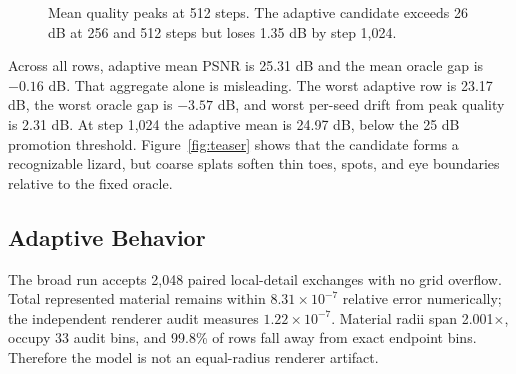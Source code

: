 \documentclass[sigconf,nonacm]{acmart}
\begin{document}
\begin{figure}[t]
\centering
{}
\caption{Mean quality peaks at 512 steps. The adaptive candidate exceeds
26 dB at 256 and 512 steps but loses 1.35 dB by step 1,024.}
\label{fig:psnr}
\end{figure}

Across all rows, adaptive mean PSNR is 25.31 dB and the mean oracle gap is
$-0.16$ dB. That aggregate alone is misleading. The worst adaptive row is
23.17 dB, the worst oracle gap is $-3.57$ dB, and worst per-seed drift from
peak quality is 2.31 dB. At step 1,024 the adaptive mean is 24.97 dB, below
the 25 dB promotion threshold. Figure~\ref{fig:teaser} shows that the
candidate forms a recognizable lizard, but coarse splats soften thin toes,
spots, and eye boundaries relative to the fixed oracle.

\subsection{Adaptive Behavior}

The broad run accepts 2,048 paired local-detail exchanges with no grid
overflow. Total represented material remains within
$8.31\times10^{-7}$ relative error numerically; the independent renderer audit
measures $1.22\times10^{-7}$. Material radii span 2.001$\times$, occupy 33
audit bins, and 99.8\% of rows fall away from exact endpoint bins. Therefore
the model is not an equal-radius renderer artifact.
\end{document}
